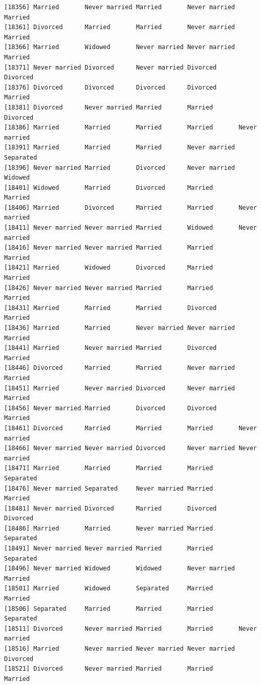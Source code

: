 \documentclass[
  letterpaper,
  DIV=11,
  numbers=noendperiod,
  oneside]{scrartcl}
\begin{document}
\begin{verbatim}
[18356] Married       Never married Married       Never married Married      
[18361] Divorced      Married       Married       Never married Married      
[18366] Married       Widowed       Never married Never married Married      
[18371] Never married Divorced      Never married Divorced      Divorced     
[18376] Divorced      Divorced      Divorced      Divorced      Married      
[18381] Divorced      Never married Married       Married       Divorced     
[18386] Married       Married       Married       Married       Never married
[18391] Married       Married       Married       Never married Separated    
[18396] Never married Married       Divorced      Never married Widowed      
[18401] Widowed       Married       Divorced      Married       Married      
[18406] Married       Divorced      Married       Married       Never married
[18411] Never married Never married Married       Widowed       Never married
[18416] Never married Never married Married       Married       Married      
[18421] Married       Widowed       Divorced      Married       Married      
[18426] Never married Never married Married       Married       Married      
[18431] Married       Married       Married       Divorced      Married      
[18436] Married       Married       Never married Never married Married      
[18441] Married       Never married Married       Divorced      Married      
[18446] Divorced      Married       Married       Never married Married      
[18451] Married       Never married Divorced      Never married Married      
[18456] Never married Married       Divorced      Divorced      Married      
[18461] Divorced      Married       Married       Married       Never married
[18466] Never married Never married Divorced      Never married Never married
[18471] Married       Married       Married       Married       Separated    
[18476] Never married Separated     Never married Married       Married      
[18481] Never married Divorced      Married       Divorced      Divorced     
[18486] Married       Married       Never married Married       Separated    
[18491] Never married Never married Married       Married       Separated    
[18496] Never married Widowed       Widowed       Never married Married      
[18501] Married       Widowed       Separated     Married       Married      
[18506] Separated     Married       Married       Married       Separated    
[18511] Divorced      Never married Married       Married       Never married
[18516] Married       Never married Never married Never married Divorced     
[18521] Divorced      Never married Married       Married       Married      

\end{verbatim}
\end{document}

